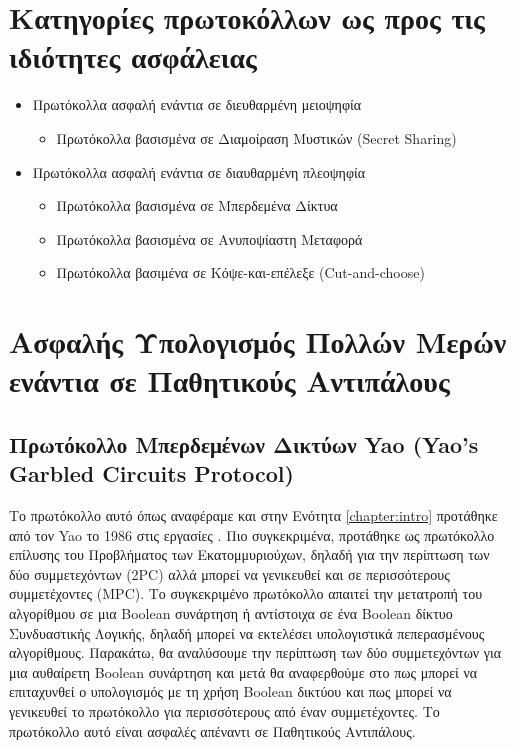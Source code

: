 \section{Κατηγορίες πρωτοκόλλων ως προς τις ιδιότητες ασφάλειας}

\begin{itemize}
    \item Πρωτόκολλα ασφαλή ενάντια σε διευθαρμένη μειοψηφία
        \begin{itemize}
            \item Πρωτόκολλα βασισμένα σε Διαμοίραση Μυστικών (Secret Sharing)
        \end{itemize}
    \item Πρωτόκολλα ασφαλή ενάντια σε διαυθαρμένη πλεοψηφία
        \begin{itemize}
            \item Πρωτόκολλα βασισμένα σε Μπερδεμένα Δίκτυα
            \item Πρωτόκολλα βασισμένα σε Ανυποψίαστη Μεταφορά
            \item Πρωτόκολλα βασιμένα σε Κόψε-και-επέλεξε (Cut-and-choose)
        \end{itemize}
\end{itemize}


\section{Ασφαλής Υπολογισμός Πολλών Μερών ενάντια σε Παθητικούς Αντιπάλους}

\subsection{Πρωτόκολλο Μπερδεμένων Δικτύων Yao (Yao's Garbled Circuits Protocol)}

Το πρωτόκολλο αυτό όπως αναφέραμε και στην Ενότητα \ref{chapter:intro} προτάθηκε από τον Yao το 1986 στις εργασίες \cite{4568207} \cite{4568388}. Πιο συγκεκριμένα, προτάθηκε ως πρωτόκολλο επίλυσης του Προβλήματος των Εκατομμυριούχων, δηλαδή για την περίπτωση των δύο συμμετεχόντων (2PC) αλλά μπορεί να γενικευθεί και σε περισσότερους συμμετέχοντες (MPC). Το συγκεκριμένο πρωτόκολλο απαιτεί την μετατροπή του αλγορίθμου σε μια Boolean συνάρτηση ή αντίστοιχα σε ένα Boolean δίκτυο Συνδυαστικής Λογικής, δηλαδή μπορεί να εκτελέσει υπολογιστικά πεπερασμένους αλγορίθμους. Παρακάτω, θα αναλύσουμε την περίπτωση των δύο συμμετεχόντων για μια αυθαίρετη Boolean συνάρτηση και μετά θα αναφερθούμε στο πως μπορεί να επιταχυνθεί ο υπολογισμός με τη χρήση Boolean δικτύου και πως μπορεί να γενικευθεί το πρωτόκολλο για περισσότερους από έναν συμμετέχοντες. Το πρωτόκολλο αυτό είναι ασφαλές απέναντι σε Παθητικούς Αντιπάλους.

